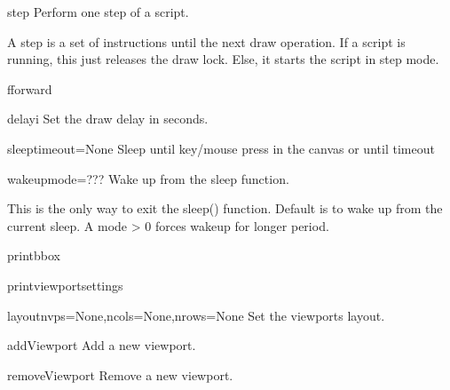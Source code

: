 \begin{funcdesc}{step}{}
Perform one step of a script.

    A step is a set of instructions until the next draw operation.
    If a script is running, this just releases the draw lock.
    Else, it starts the script in step mode.
    

\end{funcdesc}


\begin{funcdesc}{fforward}{}


\end{funcdesc}


\begin{funcdesc}{delay}{i}
Set the draw delay in seconds.

\end{funcdesc}


\begin{funcdesc}{sleep}{timeout=None}
Sleep until key/mouse press in the canvas or until timeout

\end{funcdesc}


\begin{funcdesc}{wakeup}{mode=???}
Wake up from the sleep function.

    This is the only way to exit the sleep() function.
    Default is to wake up from the current sleep. A mode > 0
    forces wakeup for longer period.
    

\end{funcdesc}


\begin{funcdesc}{printbbox}{}


\end{funcdesc}


\begin{funcdesc}{printviewportsettings}{}


\end{funcdesc}


\begin{funcdesc}{layout}{nvps=None,ncols=None,nrows=None}
Set the viewports layout.

\end{funcdesc}


\begin{funcdesc}{addViewport}{}
Add a new viewport.

\end{funcdesc}


\begin{funcdesc}{removeViewport}{}
Remove a new viewport.

\end{funcdesc}


